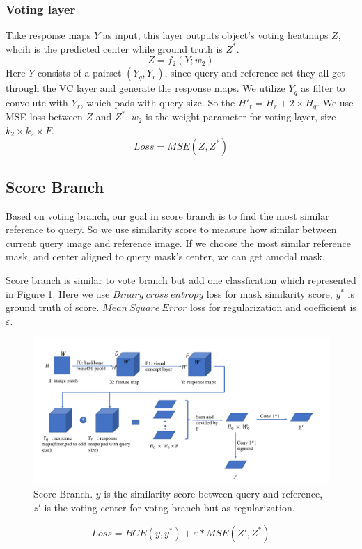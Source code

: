 \documentclass[10pt,twocolumn,letterpaper]{article}
\begin{document}
\subsubsection{Voting layer}
Take response maps $Y$ as input, this layer outputs object's voting heatmaps $Z$, whcih is the predicted center while ground truth is $Z^*$. 
\begin{equation}
   Z = f_2(Y;w_2)
\end{equation}
Here $Y$ consists of a pairset $(Y_q, Y_r)$, since query and reference set they all get through the VC layer
and generate the response maps. We utilize $Y_q$ as filter to convolute with $Y_r$, which pads with query size. 
So the $H'_r = H_r + 2 \times H_q $. We use MSE loss between $Z$ and $Z^*$. $w_2$ is the weight parameter for voting layer, size $k_2\times k_2 \times F$.
\begin{equation}
   Loss = MSE(Z, Z^*)
\end{equation}




\subsection{Score Branch}
Based on voting branch, our goal in score branch is to find the most similar reference to query. So we use similarity score to measure how similar
between current query image and reference image. If we choose the most similar reference mask, and center aligned to query mask's center, we can get amodal mask.

Score branch is similar to vote branch but add one classfication which represented in Figure \ref{fig:score}. Here we use $Binary\ cross\ entropy$ loss for mask similarity score, $y^*$ is ground truth of score. $Mean\ Square\ Error$ loss for regularization and coefficient is $\varepsilon$.
\begin{figure}
   \includegraphics[width=1\textwidth]{score.png}
   \caption{Score Branch. $y$ is the similarity score between query and reference, $z'$ is the voting center for votng branch but as regularization.}
   \label{fig:score}
\end{figure}
\begin{equation}
   Loss = BCE(y,y^*) + \varepsilon * MSE(Z', Z^*)
\end{equation}
\end{document}
